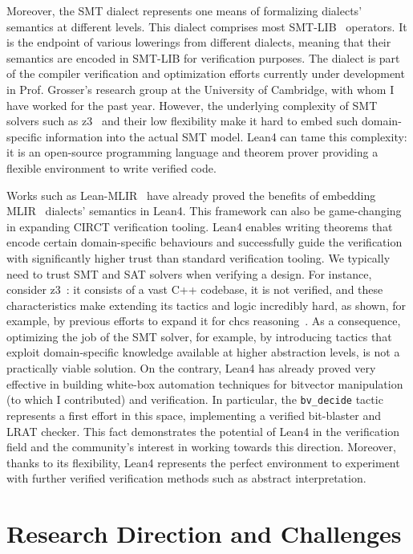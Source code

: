 \documentclass[sigconf,authorversion,nonacm, 11pt]{acmart}
\begin{document}
Moreover, the SMT dialect represents one means of formalizing dialects' semantics at different levels. 
This dialect comprises most SMT-LIB~\cite{barrett2010smt} operators. 
It is the endpoint of various lowerings from different dialects, meaning that their semantics are encoded in SMT-LIB for verification purposes.
The dialect is part of the compiler verification and optimization efforts currently under development in Prof. Grosser's research group at the University of Cambridge, with whom I have worked for the past year. 
However, the underlying complexity of SMT solvers such as z3~\cite{de2008z3} and their low flexibility make it hard to embed such domain-specific information into the actual SMT model. 
Lean4 can tame this complexity: it is an open-source programming language and theorem prover providing a flexible environment to write verified code. 

Works such as Lean-MLIR~\cite{bhat2024verifying} have already proved the benefits of embedding MLIR~\cite{mlir} dialects' semantics in Lean4.
This framework can also be game-changing in expanding CIRCT verification tooling.
Lean4 enables writing theorems that encode certain domain-specific behaviours and successfully guide the verification with significantly higher trust than standard verification tooling.
We typically need to trust SMT and SAT solvers when verifying a design. 
For instance, consider z3~\cite{de2008z3}: it consists of a vast C++ codebase, it is not verified, and these characteristics make extending its tactics and logic incredibly hard, as shown, for example, by previous efforts to expand it for \acp{chc} reasoning~\cite{gurfinkel2022program}. 
As a consequence, optimizing the job of the SMT solver, for example, by introducing tactics that exploit domain-specific knowledge available at higher abstraction levels, is not a practically viable solution. 
On the contrary, Lean4 has already proved very effective in building white-box automation techniques for bitvector manipulation (to which I contributed) and verification. 
In particular, the \texttt{bv\_decide} tactic~\cite{bvdecide} represents a first effort in this space, implementing a verified bit-blaster and LRAT checker.
This fact demonstrates the potential of Lean4 in the verification field and the community's interest in working towards this direction. 
Moreover, thanks to its flexibility, Lean4 represents the perfect environment to experiment with further verified verification methods such as abstract interpretation.

\section{Research Direction and Challenges}
\end{document}

